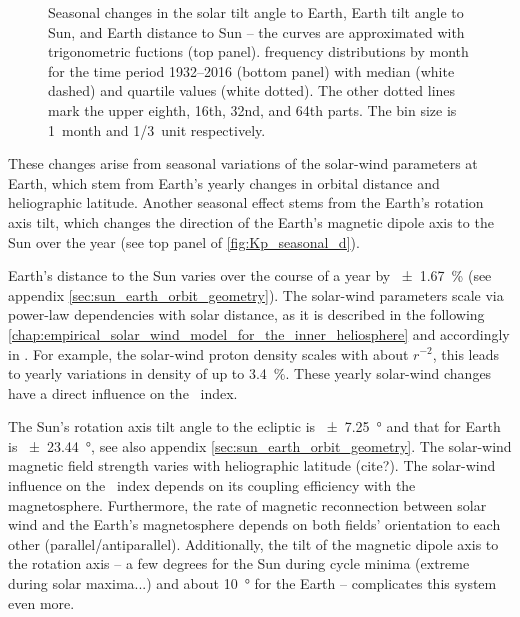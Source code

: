 \begin{figure}[htb]
\begin{floatrow}
{		}{
			\caption{Seasonal changes in the solar tilt angle to Earth, Earth tilt angle to Sun, and Earth distance to Sun -- the curves are approximated with trigonometric fuctions (top panel). \Kp{} frequency distributions by month for the time period 1932--2016 (bottom panel) with median (white dashed) and quartile values (white dotted). The other dotted lines mark the upper eighth, 16th, 32nd, and 64th parts. The bin size is 1~month and \SI{1/3}{\Kp}~unit respectively.}
			\label{fig:Kp_seasonal_d}
		}
	\end{floatrow}
\end{figure}
These \Kp{} changes arise from seasonal variations of the solar-wind parameters at Earth, which stem from Earth's yearly changes in orbital distance and heliographic latitude. Another seasonal effect stems from the Earth's rotation axis tilt, which changes the direction of the Earth's magnetic dipole axis to the Sun over the year (see top panel of \autoref{fig:Kp_seasonal_d}).

Earth's distance to the Sun varies over the course of a year by \SI{+-1.67}{\percent} (see appendix \autoref{sec:sun_earth_orbit_geometry}). The solar-wind parameters scale via power-law dependencies with solar distance, as it is described in the following \autoref{chap:empirical_solar_wind_model_for_the_inner_heliosphere} and accordingly in \citet{Venzmer2018}. For example, the solar-wind proton density scales with about $r^{-2}$, this leads to yearly variations in density of up to \SI{3.4}{\percent}. These yearly solar-wind changes have a direct influence on the \Kp{}~index.

The Sun's rotation axis tilt angle to the ecliptic is \SI{+-7.25}{\degree} and that for Earth is \SI{+-23.44}{\degree}, see also appendix \autoref{sec:sun_earth_orbit_geometry}. The solar-wind magnetic field strength varies with heliographic latitude (cite?). The solar-wind influence on the \Kp{}~index depends on its coupling efficiency with the magnetosphere. Furthermore, the rate of magnetic reconnection between solar wind and the Earth's magnetosphere depends on both fields' orientation to each other (parallel/antiparallel). Additionally, the tilt of the magnetic dipole axis to the rotation axis -- a few degrees for the Sun during cycle minima (extreme during solar maxima...) and about \SI{10}{\degree} for the Earth -- complicates this system even more.

